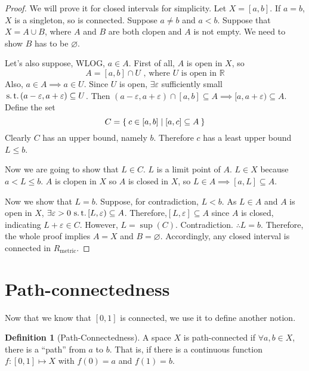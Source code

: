 \documentclass[12pt]{amsart}
\newcommand{\bbR}{\mathbb{R}}
\newcommand{\suchthat}{\operatorname{\thinspace s.t. \thinspace}}
\theoremstyle{plain}
\theoremstyle{remark}
\theoremstyle{definition}
\newtheorem*{define}{Definition}
\begin{document}
\begin{proof}
	We will prove it for closed intervals for simplicity.
	\newline
	Let $X = [a, b]$. If $a = b$, $X$ is a singleton, so is connected. Suppose $a \neq b$ and $a < b$. Suppose that $X = A \cup B$, where $A$ and $B$ are both clopen and $A$ is not empty. We need to show $B$ has to be $\varnothing$. 
	\par
	Let's also suppose, WLOG, $a \in A$. First of all, $A$ is open in $X$, so 
	\begin{equation*}
		A = [a, b] \cap U \text{ , where } U \text{ is open in } \bbR
	\end{equation*}
	Also, $a \in A \implies a \in U$. Since $U$ is open, $\exists \varepsilon $ sufficiently small $\suchthat (a-\varepsilon, a+\varepsilon) \subseteq U$.
	Then $(a-\varepsilon, a+\varepsilon) \cap [a, b] \subseteq A \implies [a, a+\varepsilon) \subseteq A$.
	\newline
	Define the set 
	\begin{equation*}
		C = \Set{c \in [a, b]| [a, c] \subseteq A}
	\end{equation*}
	Clearly $C$ has an upper bound, namely $b$. Therefore $c$ has a least upper bound $L \leqslant b$.
	\par
	Now we are going to show that $L \in C$.
	\newline
	$L$ is a limit point of $A$. $L \in X$ because $a < L \leqslant b$. $A$ is clopen in $X$ so $A$ is closed in $X$, so $L \in A \implies [a, L] \subseteq A$.
	\par
	Now we show that $L = b$. Suppose, for contradiction,  $L < b$.
	As $L\in A$ and $A$ is open in $X$, $\exists \varepsilon > 0 \suchthat [L, \varepsilon) \subseteq A$. Therefore,$[L, \varepsilon] \subseteq A$ since $A$ is closed, indicating $L + \varepsilon \in C$. However, $L = \sup(C)$. Contradiction. 
	$\therefore L = b$.
	Therefore, the whole proof implies $A = X$ and $B = \varnothing$. Accordingly,  any closed interval is connected in $R_{\text{metric}}$.
\end{proof}

\section*{Path-connectedness}
Now that we know that $[0,1]$ is connected, we use it to define another notion.

\begin{define}[Path-Connectedness]
	A space $X$ is path-connected if $\forall a,b \in X$, there is a ``path'' from $a$ to $b$. That is, if there is a continuous function $f:[0,1] \mapsto X$ with $f(0) = a$ and $f(1) = b$.
\end{define}
\end{document}
